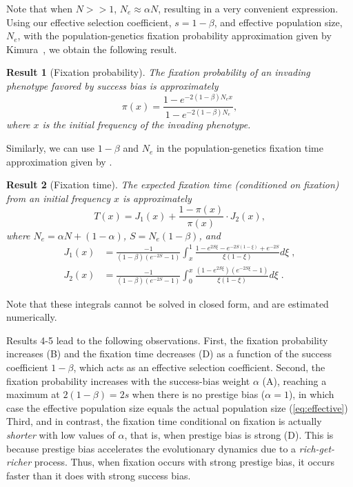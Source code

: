 \documentclass[12pt]{extarticle}
\newtheorem{result}{Result}
\begin{document}
Note that when $N>>1$, $N_e \approx \alpha N$, resulting in a very convenient expression.\\

Using our effective selection coefficient, $s=1-\beta$, and effective population size, $N_e$, with the population-genetics fixation probability approximation given by Kimura~\citep[eq.~8]{kimura}, we obtain the following result.\\

\begin{result}[Fixation probability]
The fixation probability of an invading phenotype favored by success bias is approximately 
\begin{equation}\label{eq:kimura_p}
\pi(x) = \frac{1-e^{-2(1-\beta)N_e x}}{1-e^{-2(1-\beta)N_e}},
\end{equation}
where $x$ is the initial frequency of the invading phenotype.
\end{result}

Similarly, we can use $1-\beta$ and $N_e$ in the population-genetics fixation time approximation given by \citep[eq.~17]{kimura_average}.\\

\begin{result}[Fixation time] The expected fixation time (conditioned on fixation) from an initial frequency $x$ is approximately
\begin{equation} \label{eq:kimura_t}
T(x) = J_1(x) + \frac{1-\pi(x)}{\pi(x)}\cdot J_2(x),
\end{equation}
where $N_e=\alpha N + (1-\alpha)$, $S=N_e(1-\beta)$, and
\begin{equation}
\begin{aligned}
J_1(x) &= \frac{-1}{(1-\beta)(e^{-2S}-1)}\int_x^1 \frac{1-e^{2S\xi}-e^{-2S(1-\xi)}+e^{-2S}}{\xi(1-\xi)}d\xi \;, \\
J_2(x) &= \frac{-1}{(1-\beta)(e^{-2S}-1)}\int_0^x \frac{(1-e^{2S\xi})(e^{-2S\xi}-1)}{\xi(1-\xi)}d\xi \;.
\end{aligned}
\end{equation}
\end{result}
Note that these integrals cannot be solved in closed form, and are estimated numerically.

Results 4-5 lead to the following observations. 
First, the fixation probability increases (B) and the fixation time decreases (D) as a function of the success coefficient $1-\beta$, which acts as an effective selection coefficient.
Second, the fixation probability increases with the success-bias weight $\alpha$ (A), reaching a maximum at $2(1-\beta)=2s$ when there is no prestige bias ($\alpha=1$), in which case the effective population size equals the actual population size (\cref{eq:effective})
Third, and in contrast, the fixation time conditional on fixation is actually \emph{shorter} with low values of $\alpha$, that is, when prestige bias is strong (D). This is because prestige bias accelerates the evolutionary dynamics due to a \emph{rich-get-richer} process. Thus, when fixation occurs with strong prestige bias, it occurs faster than it does with strong success bias.
\end{document}
